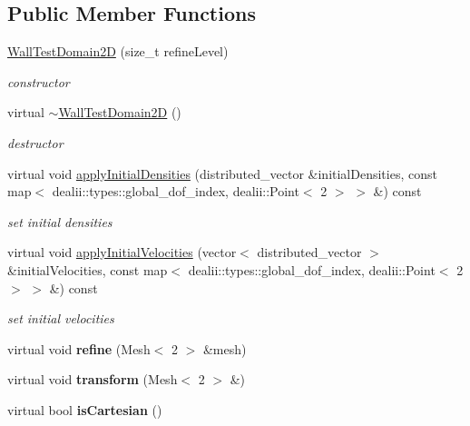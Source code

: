 \subsection*{Public Member Functions}
\begin{DoxyCompactItemize}
\item 
\hyperlink{classWallTestDomain2D_ae2a5588bd00b23f67587f5030520daca}{WallTestDomain2D} (size\_\-t refineLevel)
\begin{DoxyCompactList}\small\item\em constructor \item\end{DoxyCompactList}\item 
\hypertarget{classWallTestDomain2D_af086a6015fed51c4e1bd14e39fa52971}{
virtual \hyperlink{classWallTestDomain2D_af086a6015fed51c4e1bd14e39fa52971}{$\sim$WallTestDomain2D} ()}
\label{classWallTestDomain2D_af086a6015fed51c4e1bd14e39fa52971}

\begin{DoxyCompactList}\small\item\em destructor \item\end{DoxyCompactList}\item 
virtual void \hyperlink{classWallTestDomain2D_af8d57a6c29029514a2f2d09547f7fba1}{applyInitialDensities} (distributed\_\-vector \&initialDensities, const map$<$ dealii::types::global\_\-dof\_\-index, dealii::Point$<$ 2 $>$ $>$ \&) const 
\begin{DoxyCompactList}\small\item\em set initial densities \item\end{DoxyCompactList}\item 
virtual void \hyperlink{classWallTestDomain2D_ad2f712c227bc9ada17002006e90de3a1}{applyInitialVelocities} (vector$<$ distributed\_\-vector $>$ \&initialVelocities, const map$<$ dealii::types::global\_\-dof\_\-index, dealii::Point$<$ 2 $>$ $>$ \&) const 
\begin{DoxyCompactList}\small\item\em set initial velocities \item\end{DoxyCompactList}\item 
\hypertarget{classWallTestDomain2D_a5d7fbb94be87a914c46813eb0782f2f8}{
virtual void {\bfseries refine} (Mesh$<$ 2 $>$ \&mesh)}
\label{classWallTestDomain2D_a5d7fbb94be87a914c46813eb0782f2f8}

\item 
\hypertarget{classWallTestDomain2D_a66a7a884d0abd4c23144892bd9ff2fc9}{
virtual void {\bfseries transform} (Mesh$<$ 2 $>$ \&)}
\label{classWallTestDomain2D_a66a7a884d0abd4c23144892bd9ff2fc9}

\item 
\hypertarget{classWallTestDomain2D_adaf245867394b8767a1f9491b07fc639}{
virtual bool {\bfseries isCartesian} ()}
\label{classWallTestDomain2D_adaf245867394b8767a1f9491b07fc639}

\end{DoxyCompactItemize}



